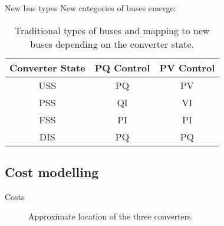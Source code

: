 \begin{frame}{New bus types}
New categories of buses emerge:

\begin{table}[!htb]\centering
  \caption{Traditional types of buses and mapping to new buses depending on the converter state.}
  \begin{tabular}{ccc}
    \hline
    \textbf{Converter State} & \textbf{PQ Control} & \textbf{PV Control} \\
    \hline
    \hline
    USS & PQ & PV \\
    PSS & QI & VI \\
    FSS & PI & PI \\
    DIS & PQ & PQ \\
    \hline
  \end{tabular}
  \label{tab:stat}
\end{table}

\end{frame}



\subsection{Cost modelling}

\begin{frame}{Costs}

\begin{figure}[!htb]\centering
{}
\caption{Approximate location of the three converters.}
\label{fig:texas}
\end{figure}

\end{frame}


